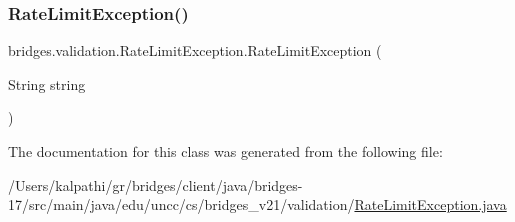 \subsubsection{\texorpdfstring{Rate\+Limit\+Exception()}{RateLimitException()}}
{\footnotesize\ttfamily bridges.\+validation.\+Rate\+Limit\+Exception.\+Rate\+Limit\+Exception (\begin{DoxyParamCaption}\item[{String}]{string }\end{DoxyParamCaption})}



The documentation for this class was generated from the following file\+:\begin{DoxyCompactItemize}
\item 
/\+Users/kalpathi/gr/bridges/client/java/bridges-\/17/src/main/java/edu/uncc/cs/bridges\+\_\+v21/validation/\mbox{\hyperlink{_rate_limit_exception_8java}{Rate\+Limit\+Exception.\+java}}\end{DoxyCompactItemize}
